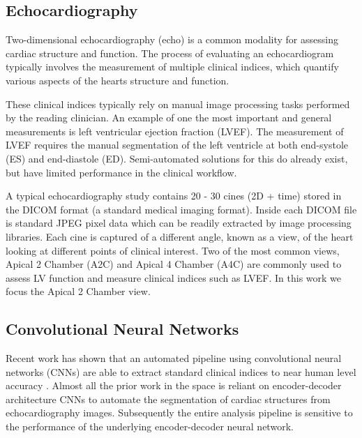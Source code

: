 \subsection{Echocardiography}
Two-dimensional echocardiography (echo) is a common modality for assessing
cardiac structure and function. The process of evaluating an echocardiogram
typically involves the measurement of multiple clinical indices, which quantify
various aspects of the hearts structure and function. \newline

These clinical indices typically rely on manual image processing tasks performed
by the reading clinician. An example of one the most important and general
measurements is left ventricular ejection fraction (LVEF). The measurement of
LVEF requires the manual segmentation of the left ventricle at both end-systole
(ES) and end-diastole (ED). Semi-automated solutions for this do already exist,
but have limited performance in the clinical workflow. \newline

A typical echocardiography study contains 20 - 30 cines (2D + time) stored in
the DICOM format (a standard medical imaging format). Inside each DICOM file is
standard JPEG pixel data which can be readily extracted by image processing
libraries. Each cine is captured of a different angle, known as a view, of the
heart looking at different points of clinical interest. Two of the most common
views, Apical 2 Chamber (A2C) and Apical 4 Chamber (A4C) are commonly used to
assess LV function and measure clinical indices such as LVEF. In this work we
focus the Apical 2 Chamber view.\newline

\subsection{Convolutional Neural Networks}

Recent work has shown that an automated pipeline using convolutional neural
networks (CNNs) are able to extract standard clinical indices to near human
level accuracy \cite{zhangFullyAutomatedEchocardiogram2018}. Almost all the
prior work in the space is reliant on encoder-decoder architecture CNNs to
automate the segmentation of cardiac structures from echocardiography images.
Subsequently the entire analysis pipeline is sensitive to the performance of the
underlying encoder-decoder neural network. \newline

